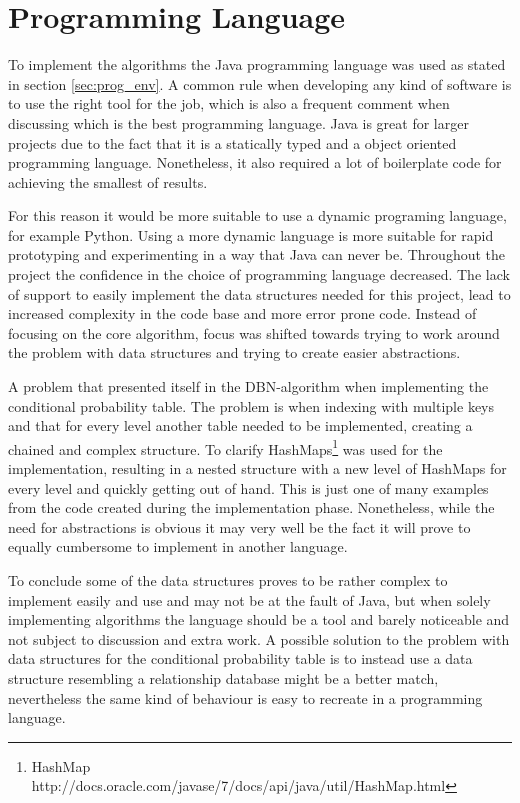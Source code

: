 \section{Programming Language}
\label{sec:prog_lang_eval}
To implement the algorithms the Java programming language was used as stated in section \ref{sec:prog_env}. A common rule when developing any kind of software is to use the right tool for the job, which is also a frequent comment when discussing which is the best programming language. Java is great for larger projects due to the fact that it is a statically typed and a object oriented programming language. Nonetheless, it also required a lot of boilerplate code for achieving the smallest of results. 

For this reason it would be more suitable to use a dynamic programing language, for example Python. Using a more dynamic language is more suitable for rapid prototyping and experimenting in a way that Java can never be. Throughout the project the confidence in the choice of programming language decreased. The lack of support to easily implement the data structures needed for this project, lead to increased complexity in the code base and more error prone code. Instead of focusing on the core algorithm, focus was shifted towards trying to work around the problem with data structures and trying to create easier abstractions. 

A problem that presented itself in the DBN-\etre algorithm when implementing the conditional probability table. The problem is when indexing with multiple keys and that for every level another table needed to be implemented, creating a chained and complex structure. To clarify HashMaps\footnote{HashMap http://docs.oracle.com/javase/7/docs/api/java/util/HashMap.html} was used for the implementation, resulting in a nested structure with a new level of HashMaps for every level and quickly getting out of hand. This is just one of many examples from the code created during the implementation phase. Nonetheless, while the need for abstractions is obvious it may very well be the fact it will prove to equally cumbersome to implement in another language.

To conclude some of the data structures proves to be rather complex to implement easily and use and may not be at the fault of Java, but when solely implementing algorithms the language should be a tool and barely noticeable and not subject to discussion and extra work. A possible solution to the problem with data structures for the conditional probability table is to instead use a data structure resembling a relationship database might be a better match, nevertheless the same kind of behaviour is easy to recreate in a programming language.
